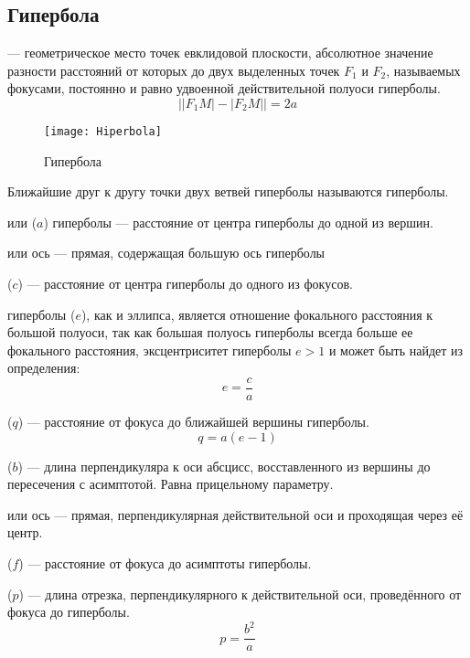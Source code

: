 \subsection{Гипербола}
 
{\bfseries {}} --- геометрическое место точек евклидовой плоскости, абсолютное значение разности расстояний от которых до двух выделенных точек $F_1$ и $F_2$, называемых фокусами, постоянно и равно удвоенной действительной полуоси гиперболы.
\begin{equation}
\bigl||F_1M|-|F_2M|\bigr|=2a
\end{equation}
\begin{figure}[h!]
\centering
\texttt{[image: Hiperbola]}
\caption{Гипербола \label{pic:the-pic}}
\end{figure}

Ближайшие друг к другу точки двух ветвей гиперболы называются  гиперболы.

 или  ($a$) гиперболы --- расстояние от центра гиперболы до одной из вершин.

 или  ось ---  прямая, содержащая большую ось гиперболы

 ($c$) ---  расстояние от центра гиперболы до одного из фокусов.

 гиперболы ($e$), как и  эллипса, является отношение фокального расстояния к большой полуоси, так как большая полуось гиперболы всегда больше ее фокального расстояния, эксцентриситет гиперболы $e > 1$ и может быть найдет из определения:\begin{equation}
e=\frac{c}{a}
\end{equation}

 ($q$) --- расстояние от фокуса до ближайшей вершины гиперболы.\begin{equation}
q=a(e-1)
\end{equation}

 ($b$) --- длина перпендикуляра к оси абсцисс, восставленного из вершины до пересечения с асимптотой. Равна прицельному параметру.

 или  ось --- прямая, перпендикулярная действительной оси и проходящая через её центр.

 ($f$) --- расстояние от фокуса до асимптоты гиперболы.

 ($p$) --- длина отрезка, перпендикулярного к действительной оси, проведённого от фокуса до гиперболы.
\begin{equation}
p=\frac{b^2}{a}
\end{equation}\\

